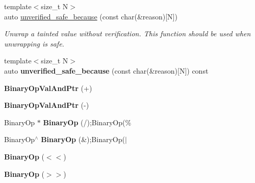 \begin{DoxyCompactItemize}
{\footnotesize template$<$size\+\_\+t N$>$ }\\auto \hyperlink{classrlbox_1_1tainted__base__impl_a1292132a467d30150be6d4e2b72ff6b2}{unverified\+\_\+safe\+\_\+because} (const char(\&reason)\mbox{[}N\mbox{]})
\begin{DoxyCompactList}\small\item\em Unwrap a tainted value without verification. This function should be used when unwrapping is safe. \end{DoxyCompactList}\item 
\mbox{\label{classrlbox_1_1tainted__base__impl_a88d4ea11a08ad91cb7ead1b80908f7f2}} 
{\footnotesize template$<$size\+\_\+t N$>$ }\\auto {\bfseries unverified\+\_\+safe\+\_\+because} (const char(\&reason)\mbox{[}N\mbox{]}) const
\item 
\mbox{\label{classrlbox_1_1tainted__base__impl_ac11254da0346088f7e2ccfdccf87deb1}} 
{\bfseries Binary\+Op\+Val\+And\+Ptr} (+)
\item 
\mbox{\label{classrlbox_1_1tainted__base__impl_ab64e73357c9a9387ca281d31e17bc490}} 
{\bfseries Binary\+Op\+Val\+And\+Ptr} (-\/)
\item 
\mbox{\label{classrlbox_1_1tainted__base__impl_af6fc3e13ab58feba9d6df1b9965055c0}} 
Binary\+Op $\ast$ {\bfseries Binary\+Op} (/);Binary\+Op(\%
\item 
\mbox{\label{classrlbox_1_1tainted__base__impl_a03f7e6cbb4ac6cc48b5f523c69863fee}} 
Binary\+Op$^\wedge$ {\bfseries Binary\+Op} (\&);Binary\+Op($\vert$
\item 
\mbox{\label{classrlbox_1_1tainted__base__impl_a100c45337a0ad48eb18ac977edb8cc48}} 
{\bfseries Binary\+Op} ($<$$<$)
\item 
\mbox{\label{classrlbox_1_1tainted__base__impl_a60f6d9cc0d8462291f461e4183d90ec7}} 
{\bfseries Binary\+Op} ($>$$>$)
\item 
\mbox{\label{classrlbox_1_1tainted__base__impl_a30945c75dace33aa34d77c839e50d49a}} 

\end{DoxyCompactItemize}
